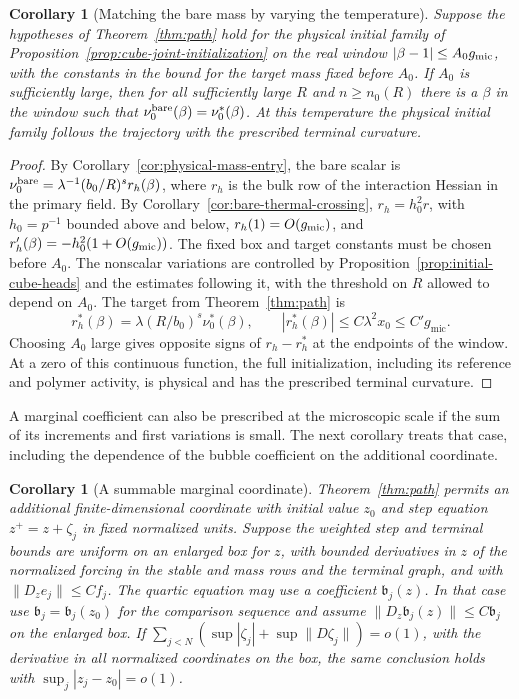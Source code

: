 \documentclass[11pt]{article}
\newtheorem{corollary}[theorem]{Corollary}
\theoremstyle{definition}
\begin{document}
\begin{corollary}[Matching the bare mass by varying the temperature]
\label{cor:physical-mass-crossing}
Suppose the hypotheses of Theorem~\ref{thm:path} hold for the
physical initial family of Proposition~\ref{prop:cube-joint-initialization}
on the real window \(\lvert\beta-1\rvert\le A_0g_{\rm mic}\), with
the constants in the bound for the target mass fixed before \(A_0\).
If \(A_0\) is sufficiently large, then for all sufficiently large
\(R\) and \(n\ge n_0(R)\) there is a \(\beta\) in the window such that
\(\nu_0^{\rm bare}(\beta)=\nu_0^*(\beta)\). At this temperature the
physical initial family follows the trajectory with the prescribed
terminal curvature.
\end{corollary}

\begin{proof}
By Corollary~\ref{cor:physical-mass-entry}, the bare scalar
is \(\nu_0^{\rm bare}=\lambda^{-1}(b_0/R)^s r_h(\beta)\), where
\(r_h\) is the bulk row of the interaction Hessian in the primary
field. By Corollary~\ref{cor:bare-thermal-crossing},
\(r_h=h_0^2 r\), with \(h_0=p^{-1}\) bounded above and below,
\(r_h(1)=O(g_{\rm mic})\), and \(r_h'(\beta)=-h_0^2(1+O(g_{\rm mic}))\).
The fixed box and target constants must be chosen before \(A_0\).
The nonscalar variations are controlled by
Proposition~\ref{prop:initial-cube-heads} and the estimates following it,
with the threshold on \(R\) allowed to depend on \(A_0\).
The target from Theorem~\ref{thm:path} is
\begin{equation}
 r_h^*(\beta)=\lambda(R/b_0)^s\nu_0^*(\beta),\qquad
 |r_h^*(\beta)|\le C\lambda^2 x_0\le C' g_{\mathrm{mic}}.
\end{equation}
Choosing \(A_0\) large gives opposite signs of
\(r_h-r_h^*\) at the endpoints of the window. At a zero of this
continuous function, the full initialization, including its
reference and polymer activity, is physical and has the prescribed
terminal curvature.
\end{proof}

A marginal coefficient can also be prescribed at the microscopic
scale if the sum of its increments and first variations is small.
The next corollary treats that case, including the dependence of
the bubble coefficient on the additional coordinate.

\begin{corollary}[A summable marginal coordinate]\label{cor:marginal}
Theorem~\ref{thm:path} permits an additional finite-dimensional
coordinate with initial value \(z_0\) and step equation
\(z^+=z+\zeta_j\) in fixed normalized units. Suppose the weighted
step and terminal bounds are uniform on an enlarged box for
\(z\), with bounded derivatives in \(z\) of the normalized
forcing in the stable and mass rows and the terminal graph,
and with \(\|D_z e_j\|\le C f_j\).
The quartic equation may use a coefficient \(\mathfrak b_j(z)\).
In that case use \(\mathfrak b_j=\mathfrak b_j(z_0)\) for the
comparison sequence and assume
\(\|D_z\mathfrak b_j(z)\|\le C\mathfrak b_j\) on the enlarged box.
If \(\sum_{j<N}(\sup|\zeta_j|+\sup\|D\zeta_j\|)=o(1)\), with
the derivative in all normalized coordinates on the box, the
same conclusion holds with
\(\sup_j|z_j-z_0|=o(1)\).
\end{corollary}
\end{document}
